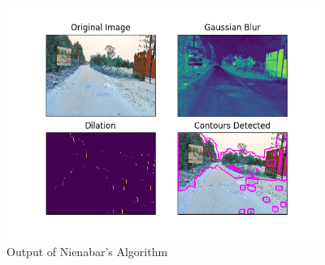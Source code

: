 \documentclass[12pt,a4paper]{article}
\begin{document}
\begin{itemize}

    

    \begin{figure}[ht!]
        \centering
        \includegraphics[width = 4in]{images/nienabar_4.png}
        \caption{Output of Nienabar's Algorithm}
    \end{figure}
    

    


\end{itemize}
\end{document}
